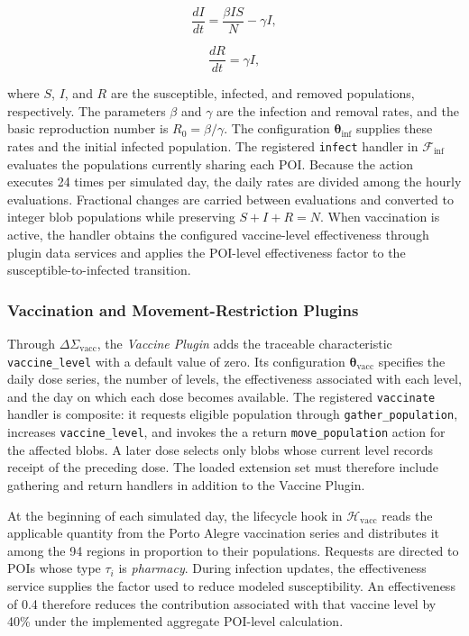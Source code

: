 \begin{equation}
\label{eq:large_scale_epidemic_delta_i}
   \frac{dI}{dt}=\frac{\beta I S}{N}-\gamma I,
\end{equation}

\begin{equation}
\label{eq:large_scale_epidemic_delta_r}
   \frac{dR}{dt}=\gamma I,
\end{equation}

where $S$, $I$, and $R$ are the susceptible, infected, and removed populations, respectively. The parameters $\beta$ and $\gamma$ are the infection and removal rates, and the basic reproduction number is $R_0=\beta/\gamma$. The configuration $\bm{\theta}_{\mathrm{inf}}$ supplies these rates and the initial infected population. The registered \texttt{infect} handler in $\mathcal{F}_{\mathrm{inf}}$ evaluates the populations currently sharing each POI. Because the action executes 24 times per simulated day, the daily rates are divided among the hourly evaluations. Fractional changes are carried between evaluations and converted to integer blob populations while preserving $S+I+R=N$. When vaccination is active, the handler obtains the configured vaccine-level effectiveness through plugin data services and applies the POI-level effectiveness factor to the susceptible-to-infected transition.

\subsubsection{Vaccination and Movement-Restriction Plugins}

Through $\Delta\Sigma_{\mathrm{vacc}}$, the \textit{Vaccine Plugin} adds the traceable characteristic \texttt{vaccine\_level} with a default value of zero. Its configuration $\bm{\theta}_{\mathrm{vacc}}$ specifies the daily dose series, the number of levels, the effectiveness associated with each level, and the day on which each dose becomes available. The registered \texttt{vaccinate} handler is composite: it requests eligible population through \texttt{gather\_population}, increases \texttt{vaccine\_level}, and invokes the a return \texttt{move\_population} action for the affected blobs. A later dose selects only blobs whose current level records receipt of the preceding dose. The loaded extension set must therefore include gathering and return handlers in addition to the Vaccine Plugin.

At the beginning of each simulated day, the lifecycle hook in $\mathcal{H}_{\mathrm{vacc}}$ reads the applicable quantity from the Porto Alegre vaccination series and distributes it among the 94 regions in proportion to their populations. Requests are directed to POIs whose type $\tau_i$ is \textit{pharmacy}. During infection updates, the effectiveness service supplies the factor used to reduce modeled susceptibility. An effectiveness of 0.4 therefore reduces the contribution associated with that vaccine level by 40\% under the implemented aggregate POI-level calculation.

